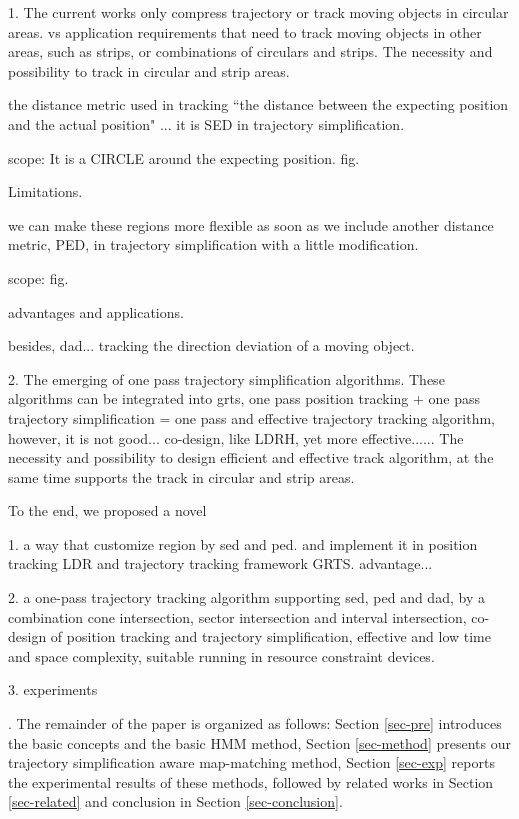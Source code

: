 
1. The current works only compress trajectory or track moving objects in circular areas. vs application requirements that need to track moving objects in other areas, such as strips, or combinations of circulars and strips.
The necessity and possibility to track in circular and strip areas.

the distance metric used in tracking ``the distance between the expecting position and the actual position" ... it is SED in trajectory simplification. 

scope: It is  a CIRCLE around the expecting position. fig.

Limitations.

we can make these regions more flexible as soon as we include another distance metric, PED, in trajectory simplification with a little modification.

scope: fig.

advantages and applications.

besides, dad... tracking the direction deviation of a moving object.


2. The emerging of one pass trajectory simplification algorithms. These algorithms can be integrated into grts, one pass position tracking + one pass trajectory simplification = one pass and effective trajectory tracking algorithm, however, it is not good... co-design, like LDRH, yet more effective...... 
The necessity and possibility to design efficient and effective track algorithm, at the same time supports the track in circular and strip areas.

To the end, we proposed a novel 

1. a way that customize region by sed and ped. and implement it in position tracking LDR and trajectory tracking framework GRTS. advantage...

2. a one-pass trajectory tracking algorithm supporting sed, ped and dad, by a combination cone intersection, sector intersection and interval intersection, \ie co-design of position tracking and trajectory simplification, effective and low time and space complexity, suitable running in resource constraint devices.

3. experiments

.
The remainder of the paper is organized as follows:
Section \ref{sec-pre} introduces the basic concepts and the basic HMM method,
Section \ref{sec-method} presents our trajectory simplification aware map-matching method,
Section \ref{sec-exp} reports the experimental results of these methods, followed by related works in Section \ref{sec-related} and conclusion in Section \ref{sec-conclusion}.



